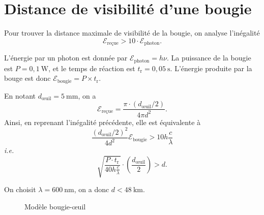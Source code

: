 \section{Distance de visibilité d'une bougie}

Pour trouver la distance maximale de visibilité de la bougie, on analyse l'inégalité \[
	\mathcal{E}_\text{reçue} > 10 \cdot \mathcal{E}_\mathrm{photon}
.\] 

L'énergie par un photon est donnée par $\mathcal{E}_\mathrm{photon} = h \nu$.
La puissance de la bougie est $P = 0{,}1\:\mathrm{W}$, et le temps de réaction est $t_\mathrm{r}  = 0{,}05\:\mathrm{s}$.
L'énergie produite par la bouge est donc $\mathcal{E}_\mathrm{bougie} = P \times t_\mathrm{r}$.

En notant $d_\text{œuil} = 5\:\mathrm{mm}$, on a \[
	\mathcal{E}_\text{reçue} = \frac{\pi \cdot ( d_ \text{œuil} / 2 ) }{4\pi d^2}
.\]
Ainsi, en reprenant l'inégalité précédente, elle est équivalente à \[
	\frac{(d_ \text{œuil} / 2)^2}{4 d^2} \mathcal{E}_\mathrm{bougie} > 10 h \frac{c}{\lambda}
\] \textit{i.e.} \[
	\sqrt{\frac{P \cdot t_\mathrm{r}}{40 h \frac{c}{\lambda}}}  \cdot \left( \frac{d_\text{œuil}}{2} \right) > d
.\]

On choisit $\lambda = 600\:\mathrm{nm}$, on a donc $d < 48\:\mathrm{km}$.

\begin{figure}[H]
	\centering
	
	\caption{Modèle bougie-œuil}
\end{figure}
